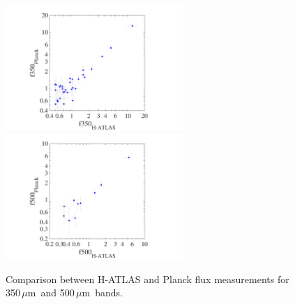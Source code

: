 \documentclass[a4paper,fleqn,usenatbib, twocolumn]{aastex61}
\def\mic{\,$\mu $m}
\begin{document}
\begin{figure}
  \includegraphics[width=0.6\textwidth, trim=40mm .0mm 0.0mm .0mm, clip=True]{planck_comp350}
  \includegraphics[width=0.6\textwidth, trim=40mm .0mm 0.0mm .0mm, clip=True]{planck_comp500}
  \caption{Comparison between H-ATLAS and Planck flux measurements for
    350\mic\ and 500\mic\ bands.}\label{fig:planck}
\end{figure}
\end{document}
